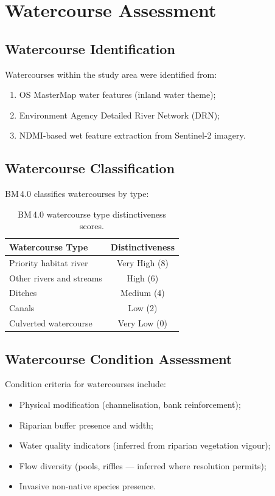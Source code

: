\section{Watercourse Assessment}

\subsection{Watercourse Identification}

Watercourses within the study area were identified from:
\begin{enumerate}[nosep]
  \item OS MasterMap water features (inland water theme);
  \item Environment Agency Detailed River Network (DRN);
  \item NDMI-based wet feature extraction from Sentinel-2 imagery.
\end{enumerate}

\subsection{Watercourse Classification}

BM\,4.0 classifies watercourses by type:

\begin{table}[H]
\centering
\caption{BM\,4.0 watercourse type distinctiveness scores.}
\label{tab:water-distinctiveness}
\begin{tabular}{lc}
\toprule
\textbf{Watercourse Type} & \textbf{Distinctiveness} \\
\midrule
Priority habitat river            & Very High (8) \\
Other rivers and streams          & High (6) \\
Ditches                           & Medium (4) \\
Canals                            & Low (2) \\
Culverted watercourse             & Very Low (0) \\
\bottomrule
\end{tabular}
\end{table}

\subsection{Watercourse Condition Assessment}

Condition criteria for watercourses include:
\begin{itemize}[nosep]
  \item Physical modification (channelisation, bank reinforcement);
  \item Riparian buffer presence and width;
  \item Water quality indicators (inferred from riparian vegetation vigour);
  \item Flow diversity (pools, riffles — inferred where resolution permits);
  \item Invasive non-native species presence.
\end{itemize}

